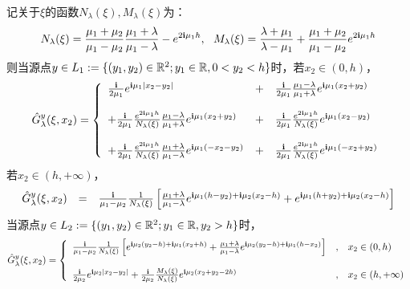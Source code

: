 \begin{lemma}\label{FT_impedance}
记关于$\xi$的函数$N_{\lambda}(\xi),M_{\lambda}(\xi)$为：
\begin{eqnarray}
  N_{\lambda}(\xi)=\frac{\mu_1+\mu_2}{\mu_1-\mu_2}\frac{\mu_1+\lambda}{\mu_1-\lambda}-e^{2\i\mu_1h},\ \
  M_{\lambda}(\xi)=\frac{\lambda+\mu_1}{\lambda-\mu_1}+\frac{\mu_1+\mu_2}{\mu_1-\mu_2}e^{2\i\mu_1h}
\end{eqnarray}
则当源点$y\in L_1:=\{(y_1,y_2)\in\mathbb{R}^2;y_1\in \mathbb{R}, 0<y_2<h\}$时，若$x_2\in(0,h)$，
\begin{eqnarray*}
  \hat{G}_{\lambda}^y(\xi,x_2)=\left\{
\begin{array}{lll}
  \frac{\mathbf{i}}{2\mu_1}e^{\mathbf{i}\mu_1|x_2-y_2|}&+&\frac{\mathbf{i}}{2\mu_1}\frac{\mu_1-\lambda}{\mu_1+\lambda}e^{\mathbf{i}\mu_1(x_2+y_2)}\\
  & &\\
  +\frac{\mathbf{i}}{2\mu_1}\frac{e^{2\mathbf{i}\mu_1h}}{N_{\lambda}(\xi)}\frac{\mu_1-\lambda}{\mu_1+\lambda}e^{\mathbf{i}\mu_1(x_2+y_2)}
  &+&\frac{\mathbf{i}}{2\mu_1}\frac{e^{2\mathbf{i}\mu_1h}}{N_{\lambda}(\xi)}e^{\mathbf{i}\mu_1(x_2-y_2)}\\
  & &\\
  +\frac{\mathbf{i}}{2\mu_1}\frac{e^{2\mathbf{i}\mu_1h}}{N_{\lambda}(\xi)}\frac{\mu_1+\lambda}{\mu_1-\lambda}e^{\mathbf{i}\mu_1(-x_2-y_2)}
  &+&\frac{\mathbf{i}}{2\mu_1}\frac{e^{2\mathbf{i}\mu_1h}}{N_{\lambda}(\xi)}e^{\mathbf{i}\mu_1(-x_2+y_2)}
\end{array}
\right.
\end{eqnarray*}
若$x_2\in(h,+\infty)$，
\begin{eqnarray*}
 \begin{array}{lll}
    \hat{G}_{\lambda}^y(\xi,x_2)&=&\frac{\mathbf{i}}{\mu_1-\mu_2}\frac{1}{N_{\lambda}(\xi)}\left[\frac{\mu_1+\lambda}{\mu_1-\lambda}e^{\mathbf{i}\mu_1(h-y_2)+\mathbf{i}\mu_2(x_2-h)}+
  e^{\mathbf{i}\mu_1(h+y_2)+\mathbf{i}\mu_2(x_2-h)}\right]
 \end{array}
\end{eqnarray*}
当源点$y\in L_2:=\{(y_1,y_2)\in\mathbb{R}^2;y_1\in \mathbb{R}, y_2>h\}$时，
\begin{eqnarray*}
\hat{G}_{\lambda}^y(\xi,x_2)=\left\{
\begin{array}{lll}
   \frac{\mathbf{i}}{\mu_1-\mu_2}\frac{1}{N_{\lambda}(\xi)}\left[e^{\mathbf{i}\mu_2(y_2-h)+\mathbf{i}\mu_1(x_2+h)}+
 \frac{\mu_1+\lambda}{\mu_1-\lambda}e^{\mathbf{i}\mu_2(y_2-h)+\mathbf{i}\mu_1(h-x_2)}\right]&,&x_2\in(0,h)\\
 & &\\
 \frac{\mathbf{i}}{2\mu_2}e^{\mathbf{i}\mu_2|x_2-y_2|}
  +\frac{\mathbf{i}}{2\mu_2}\frac{M_{\lambda}(\xi)}{N_{\lambda}(\xi)}e^{\mathbf{i}\mu_2(x_2+y_2-2h)}&,&x_2\in(h,+\infty)
\end{array}
\right.
\end{eqnarray*}
\end{lemma}

